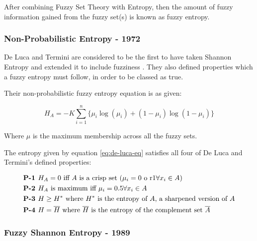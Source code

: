 After combining Fuzzy Set Theory with Entropy, then the amount of fuzzy information gained from the fuzzy set(s) is known as fuzzy entropy.

\subsubsection{Non-Probabilistic Entropy - 1972}
\label{sssec:non-prob-review}

De Luca and Termini are considered to be the first to have taken Shannon Entropy and extended it to include fuzziness \cite{DeLuca_Termini_1972}. They also defined properties which a fuzzy entropy must follow, in order to be classed as true.

Their non-probabilistic fuzzy entropy equation is as given:

\begin{equation}\label{eq:de-luca-eq}
  H_A = -K \displaystyle\sum_{i=1}^{n}{\{\mu_i\log(\mu_i) + (1 - \mu_i)\log(1 - \mu_i)\}}
\end{equation}

Where $\mu$ is the maximum membership across all the fuzzy sets.

The entropy given by equation \eqref{eq:de-luca-eq} satisfies all four of De Luca and Termini's defined properties:

  \begin{subequations} \label{eq:de-luca-cond}
    \begin{align}
      &\text{\textbf{P-1 }} H_A = 0 \text{ iff } A \text{ is a crisp set (}\mu_i = 0 \text{ o r} 1 \forall x_i \in A\text{)} \\
      &\text{\textbf{P-2 }} H_A \text{ is maximum iff }\mu_i = 0.5 \forall x_i \in A \\
      &\text{\textbf{P-3 }} H \geq H^\ast\text{ where }H^\ast\text{ is the entropy of }A\text{, a sharpened version of } A \\
      &\text{\textbf{P-4 }} H = \overline{H}\text{ where }\overline{H}\text{ is the entropy of the complement set }\overline{A}
    \end{align}
  \end{subequations}



\subsubsection{Fuzzy Shannon Entropy - 1989}

